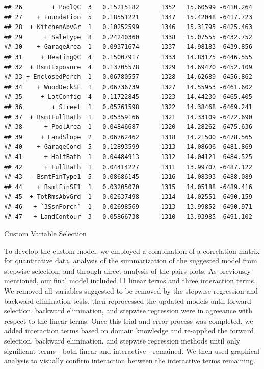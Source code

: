 \documentclass[american,]{article}
\theoremstyle{definition}
\theoremstyle{definition}
\theoremstyle{definition}
\theoremstyle{remark}
\begin{document}
\begin{verbatim}
## 26        + PoolQC  3   0.15215182      1352   15.60599 -6410.264
## 27    + Foundation  5   0.18551221      1347   15.42048 -6417.723
## 28  + KitchenAbvGr  1   0.10252599      1346   15.31795 -6425.463
## 29      + SaleType  8   0.24240360      1338   15.07555 -6432.752
## 30    + GarageArea  1   0.09371674      1337   14.98183 -6439.856
## 31     + HeatingQC  4   0.15007917      1333   14.83175 -6446.555
## 32  + BsmtExposure  4   0.13705578      1329   14.69470 -6452.109
## 33 + EnclosedPorch  1   0.06780557      1328   14.62689 -6456.862
## 34    + WoodDeckSF  1   0.06736739      1327   14.55953 -6461.602
## 35     + LotConfig  4   0.11722845      1323   14.44230 -6465.405
## 36        + Street  1   0.05761598      1322   14.38468 -6469.241
## 37  + BsmtFullBath  1   0.05359166      1321   14.33109 -6472.690
## 38      + PoolArea  1   0.04846687      1320   14.28262 -6475.636
## 39     + LandSlope  2   0.06762462      1318   14.21500 -6478.565
## 40    + GarageCond  5   0.12893599      1313   14.08606 -6481.869
## 41      + HalfBath  1   0.04484913      1312   14.04121 -6484.525
## 42      + FullBath  1   0.04414227      1311   13.99707 -6487.122
## 43  - BsmtFinType1  5   0.08686145      1316   14.08393 -6488.089
## 44    + BsmtFinSF1  1   0.03205070      1315   14.05188 -6489.416
## 45  + TotRmsAbvGrd  1   0.02637498      1314   14.02551 -6490.159
## 46   + `3SsnPorch`  1   0.02698569      1313   13.99852 -6490.971
## 47   + LandContour  3   0.05866738      1310   13.93985 -6491.102
\end{verbatim}

Custom Variable Selection

To develop the custom model, we employed a combination of a correlation
matrix for quantitative data, analysis of the summarization of the
suggested model from stepwise selection, and through direct analysis of
the pairs plots. As previously mentioned, our final model included 11
linear terms and three interaction terms. We removed all variables
suggested to be removed by the stepwise regression and backward
elimination tests, then reprocessed the updated models until forward
selection, backward elimination, and stepwise regression were in
agreeance with respect to the linear terms. Once this trial-and-error
process was completed, we added interaction terms based on domain
knowledge and re-applied the forward selection, backward elimination,
and stepwise regression methods until only significant terms - both
linear and interactive - remained. We then used graphical analysis to
visually confirm interaction between the interactive terms remaining.
\end{document}
